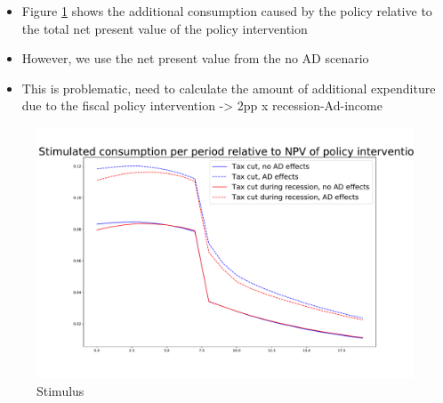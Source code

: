 \documentclass[]{article}
\begin{document}
\begin{itemize}
	\item Figure \ref{fig:stimulus} shows the additional consumption caused by the policy relative to the total net present value of the policy intervention
	\item However, we use the net present value from the no AD scenario
	\item This is problematic, need to calculate the amount of additional expenditure due to the fiscal policy intervention -> 2pp x recession-Ad-income
\end{itemize}

\begin{figure} 
	\begin{centering}
		\includegraphics[width=\linewidth]{../50kSample_BaseCal/stimulated-consumption.pdf}
		\caption{Stimulus}
		\label{fig:stimulus}
	\end{centering}
\end{figure}
\end{document}
